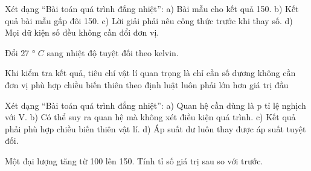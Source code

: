 \begin{ex}
Xét dạng “Bài toán quá trình đẳng nhiệt”: a) Bài mẫu cho kết quả 150. b) Kết quả bài mẫu gấp đôi 150. c) Lời giải phải nêu công thức trước khi thay số. d) Mọi dữ kiện số đều không cần đổi đơn vị.
\choiceTF

\end{ex}

\begin{ex}
Đổi 27 ° $C$ sang nhiệt độ tuyệt đối theo kelvin.
\end{ex}

\begin{ex}
Khi kiểm tra kết quả, tiêu chí vật lí quan trọng là
\choice
{chỉ cần số dương}
{không cần đơn vị}
{\True phù hợp chiều biến thiên theo định luật}
{luôn phải lớn hơn giá trị đầu}
\end{ex}

\begin{ex}
Xét dạng “Bài toán quá trình đẳng nhiệt”: a) Quan hệ cần dùng là p tỉ lệ nghịch với V. b) Có thể suy ra quan hệ mà không xét điều kiện quá trình. c) Kết quả phải phù hợp chiều biến thiên vật lí. d) Áp suất dư luôn thay được áp suất tuyệt đối.
\choiceTF

\end{ex}

\begin{ex}
Một đại lượng tăng từ 100 lên 150. Tính tỉ số giá trị sau so với trước.
\end{ex}

